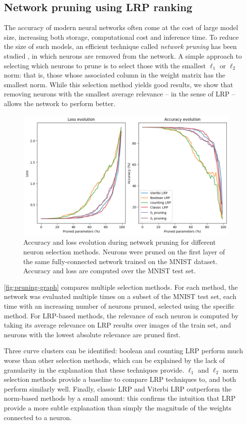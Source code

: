 \documentclass{../cs-classes/cs-classes}
\newcommand*{\1}{\digitsbb{1}}
\newcommand*{\0}{\digitsbb{0}}
\begin{document}
\subsection{Network pruning using LRP ranking}
The accuracy of modern neural networks often come at the cost of large model size, increasing both storage, computational cost and inference time. To reduce the size of such models, an efficient technique called \emph{network pruning} has been studied \cite{pruning-survey,new-pruning}, in which neurons are removed from the network. A simple approach to selecting which neurons to prune is to select those with the smallest $\ell_1$ or $\ell_2$ norm: that is, those whose associated column in the weight matrix has the smallest norm. While this selection method yields good results, we show that removing neurons with the smallest average relevance -- in the sense of LRP -- allows the network to perform better.
\begin{figure}[H]
    \centering
    \includegraphics[width=.7\textwidth]{pruning-graph-large.png}
    \caption{Accuracy and loss evolution during network pruning for different neuron selection methods. Neurons were pruned on the first layer of the same fully-connected network trained on the MNIST dataset. Accuracy and loss are computed over the MNIST test set.}
    \label{fig:pruning-graph}
\end{figure}

\autoref{fig:pruning-graph} compares multiple selection methods. For each method, the network was evaluated multiple times on a subset of the MNIST test set, each time with an increasing number of neurons pruned, selected using the specific method. For LRP-based methods, the relevance of each neuron is computed by taking its average relevance on LRP results over images of the train set, and neurons with the lowest absolute relevance are pruned first.

Three curve clusters can be identified: boolean and counting LRP perform much worse than other selection methods, which can be explained by the lack of granularity in the explanation that these techniques provide. $\ell_1$ and $\ell_2$ norm selection methods provide a baseline to compare LRP techniques to, and both perform similarly well. Finally, classic LRP and Viterbi LRP outperform the norm-based methods by a small amount: this confirms the intuition that LRP provide a more subtle explanation than simply the magnitude of the weights connected to a neuron.
\end{document}
